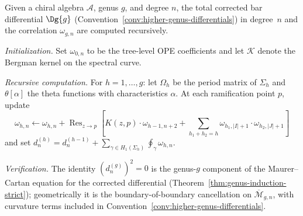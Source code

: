 \begin{construction}\label{con:higher-genus-bar}
Given a chiral algebra $\mathcal{A}$, genus $g$, and degree $n$, the total corrected bar differential $\Dg{g}$ \textup{(}Convention~\textup{\ref{conv:higher-genus-differentials})} in degree~$n$ and the correlation $\omega_{g,n}$ are computed recursively.

\emph{Initialization.}
Set $\omega_{0,n}$ to be the tree-level OPE coefficients and let $\mathcal{K}$ denote the Bergman kernel on the spectral curve.

\emph{Recursive computation.}
For $h = 1, \ldots, g$: let $\Omega_h$ be the period matrix of $\Sigma_h$ and $\theta[\alpha]$ the theta functions with characteristics $\alpha$. At each ramification point $p$, update
\[\omega_{h,n} \leftarrow \omega_{h,n} + \operatorname{Res}_{z \to p}\!\left[K(z,p) \cdot \omega_{h-1,n+2} + \sum_{h_1+h_2=h} \omega_{h_1,|I|+1} \cdot \omega_{h_2,|J|+1}\right]\]
and set $d^{(h)}_n = d^{(h-1)}_n + \sum_{\gamma \in H_1(\Sigma_h)} \oint_\gamma \omega_{h,n}$.

\emph{Verification.}
The identity $(d^{(g)}_n)^2=0$ is the genus-$g$ component of the
Maurer--Cartan equation for the corrected differential
(Theorem~\ref{thm:genus-induction-strict}); geometrically it is the
boundary-of-boundary cancellation on
$\overline{\mathcal{M}}_{g,n}$, with curvature terms included in
Convention~\ref{conv:higher-genus-differentials}.
\end{construction}

